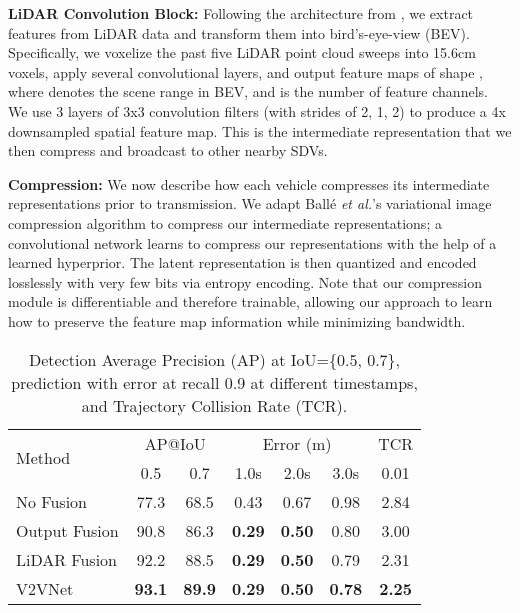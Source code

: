 \documentclass[runningheads]{llncs}
\newcommand{\etal}{\textit{et al.}}
\begin{document}
{\flushleft\bf LiDAR Convolution Block:}
\label{sec:preprocess}
Following the architecture from \cite{yang2018pixor}, we  extract 
features from 
LiDAR data
and transform them into bird's-eye-view (BEV).
Specifically, we voxelize the past five LiDAR point cloud sweeps into
15.6cm voxels, apply several convolutional layers, and output feature maps of shape , where  denotes the scene range in BEV, and  is the number of feature channels.
We use 3 layers of 3x3 convolution filters (with strides of 2, 1, 2) to produce a 4x downsampled spatial feature map.
This is the intermediate representation that we 
then compress and broadcast to other nearby SDVs. 

{\flushleft\bf Compression:}
We now describe how each vehicle compresses its intermediate representations prior to transmission.
We adapt
Ball\'e  \etal's variational image compression algorithm \cite{balle2018variational} to compress our intermediate representations; 
a convolutional network learns
to compress our representations with the help of a learned hyperprior. The latent representation is then quantized and 
encoded losslessly with very few bits via entropy encoding.
Note that our compression module is differentiable and therefore trainable, allowing our approach to learn how to preserve the feature map information while minimizing bandwidth.

\begin{table}[t]
  \centering
\begin{tabular}{l | c  c | c c c |  c}
    \hline
    \multirow{2}{*}{Method} & \multicolumn{2}{c|}{AP@IoU }
                            & \multicolumn{3}{c|}{ Error (m) }
                            & \multicolumn{1}{c}{TCR } \\
                  & 0.5 & 0.7 & 1.0s & 2.0s & 3.0s & 0.01 \\ \hline
    No Fusion     & 77.3 & 68.5 & 0.43 & 0.67 & 0.98 & 2.84  \\
    Output Fusion  & 90.8 & 86.3 & \textbf{0.29} & \textbf{0.50} & 0.80 & 3.00 \\    
    LiDAR Fusion  & 92.2 & 88.5 & \textbf{0.29} & \textbf{0.50} & 0.79 & 2.31  \\
    V2VNet         & \textbf{93.1} & \textbf{89.9} &\textbf{0.29} & \textbf{0.50} & \textbf{0.78} & \textbf{2.25} \\
\hline
  \end{tabular}
  \caption{Detection Average Precision (AP) at IoU=\{0.5, 0.7\}, prediction with  error at recall 0.9 at different timestamps, and Trajectory Collision Rate (TCR).}
  \label{tab:general}
\end{table}
\end{document}
